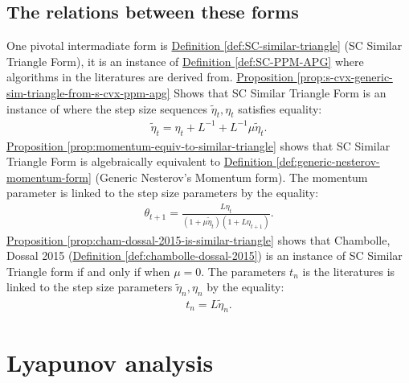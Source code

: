 \documentclass[12pt]{article}
\begin{document}
    \subsection{The relations between these forms}\label{sec:relations-between-forms}
        One pivotal intermadiate form is 
        \hyperref[def:SC-similar-triangle]
        { Definition \ref*{def:SC-similar-triangle}} 
        (SC Similar Triangle Form), it is an instance of
        \hyperref[def:SC-PPM-APG]
        {Definition \ref*{def:SC-PPM-APG}}
        where algorithms in the literatures are derived from. 
        \hyperref[prop:s-cvx-generic-sim-triangle-from-s-cvx-ppm-apg]
        {Proposition \ref*{prop:s-cvx-generic-sim-triangle-from-s-cvx-ppm-apg}}
        Shows that SC Similar Triangle Form is an instance of \SCPPMAPG where the step size sequences $\tilde \eta_t, \eta_t$ satisfies equality: 
        \begin{align}
            \tilde \eta_t =\eta_t + L^{-1} + L^{-1}\mu \tilde \eta_t. 
            \label{eqn:similar-tri-stepsize-eq}
        \end{align}
        \hyperref[prop:momentum-equiv-to-similar-triangle]
        {Proposition \ref*{prop:momentum-equiv-to-similar-triangle}}
        shows that SC Similar Triangle Form is algebraically equivalent to 
        \hyperref[def:generic-nesterov-momentum-form]{Definition \ref*{def:generic-nesterov-momentum-form}} (Generic Nesterov's Momentum form).
        The momentum parameter is linked to the step size parameters by the equality: 
        \begin{align*}
            \theta_{t + 1} = \frac{L\eta_t}{(1 + \mu \tilde\eta_{t})(1 + L\eta_{t + 1})}.
        \end{align*} 
        \hyperref[prop:cham-dossal-2015-is-similar-triangle]
        {Proposition \ref{prop:cham-dossal-2015-is-similar-triangle}}
        shows that Chambolle, Dossal 2015 (\hyperref[def:chambolle-dossal-2015]
            {Definition \ref*{def:chambolle-dossal-2015}})
        is an instance of SC Similar Triangle form if and only if when $\mu = 0$. 
        The parameters $t_n$ is the literatures is linked to the step size parameters $\tilde \eta_n, \eta_n$ by the equality: 
        \begin{align*}
            t_n = L \tilde \eta_n. 
        \end{align*}

        
\section{Lyapunov analysis}\label{sec:lyapunov-analysis}
\end{document}
